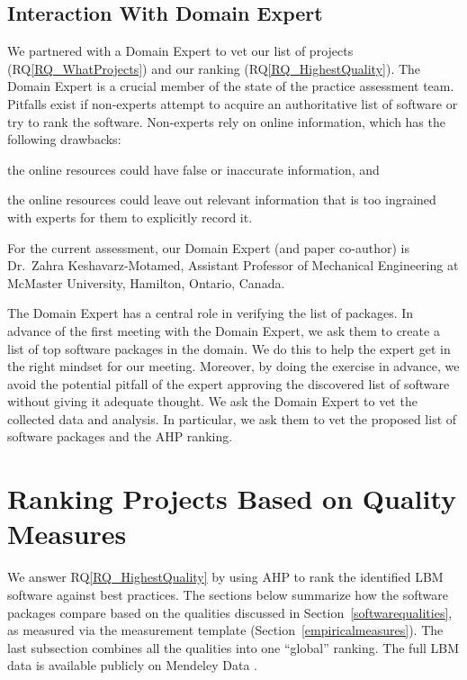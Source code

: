 \documentclass[final, 3p, times, authoryear]{elsarticle}
\newcommand{\rqref}[1]{RQ\ref{#1}}
\begin{document}
\subsection{Interaction With Domain Expert} \label{sec_vet_software_list}

We partnered with a Domain Expert to vet our list of projects
(\rqref{RQ_WhatProjects}) and our ranking (\rqref{RQ_HighestQuality}). The
Domain Expert is a crucial member of the state of the practice assessment team.
Pitfalls exist if non-experts attempt to acquire an authoritative list of
software or try to rank the software. Non-experts rely on online information,
which has the following drawbacks:
\begin{inparaenum}[i)]
  \item the online resources could have false or inaccurate information, and 
  \item the online resources could leave out relevant information that is too
  ingrained with experts for them to explicitly record it.
\end{inparaenum}
For the current assessment, our Domain Expert (and paper co-author) is Dr.\
 Zahra Keshavarz-Motamed, Assistant Professor of Mechanical Engineering at
McMaster University, Hamilton, Ontario, Canada.  

The Domain Expert has a central role in verifying the list of packages. In
advance of the first meeting with the Domain Expert, we ask them to create a
list of top software packages in the domain.  We do this to help the expert get
in the right mindset for our meeting.  Moreover, by doing the exercise in
advance, we avoid the potential pitfall of the expert approving the discovered
list of software without giving it adequate thought. We ask the Domain Expert to
vet the collected data and analysis. In particular, we ask them to vet the
proposed list of software packages and the AHP ranking.

\section{Ranking Projects Based on Quality Measures} \label{AHPresults}

We answer \rqref{RQ_HighestQuality} by using AHP to rank the identified LBM
software against best practices.  The sections below summarize how the software
packages compare based on the qualities discussed in
Section~\ref{softwarequalities}, as measured via the measurement template
(Section~\ref{empiricalmeasures}).  The last subsection combines all the
qualities into one ``global'' ranking.  The full LBM data is available publicly
on Mendeley Data \citep{Smith2022}.
\end{document}
